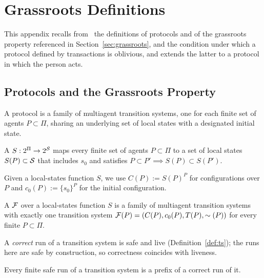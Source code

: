 \section{Grassroots Definitions}\label{appendix:grassroots-defs}

This appendix recalls from~\cite{lewis2026volitional} the definitions of protocols and of the grassroots property referenced in Section~\ref{sec:grassroots}, and the condition under which a protocol defined by transactions is oblivious, and extends the latter to a protocol in which the person acts.

\subsection{Protocols and the Grassroots Property}

A protocol is a family of multiagent transition systems, one for each finite set of agents $P \subset \Pi$, sharing an underlying set of local states with a designated initial state.

\begin{definition}\label{definition:local-states-function}
A  $S: 2^\Pi \to 2^{\mathcal{S}}$ maps every finite set of agents $P \subset \Pi$ to a set of local states $S(P) \subset \mathcal{S}$ that includes $s_0$ and satisfies $P \subset P' \implies S(P) \subset S(P')$.
\end{definition}

Given a local-states function $S$, we use $C(P) := S(P)^P$ for configurations over $P$ and $c_0(P) := \{s_0\}^P$ for the initial configuration.

\begin{definition}\label{definition:protocol}
A  $\mathcal{F}$ over a local-states function $S$ is a family of multiagent transition systems with exactly one transition system $\mathcal{F}(P) = (C(P), c_0(P), T(P), {\sim(P)})$ for every finite $P \subset \Pi$.
\end{definition}

A \emph{correct} run of a transition system is safe and live (Definition~\ref{def:ts}); the runs here are safe by construction, so correctness coincides with liveness.

\begin{lemma}\label{lemma:extension}
Every finite safe run of a transition system is a prefix of a correct run of it.
\end{lemma}

